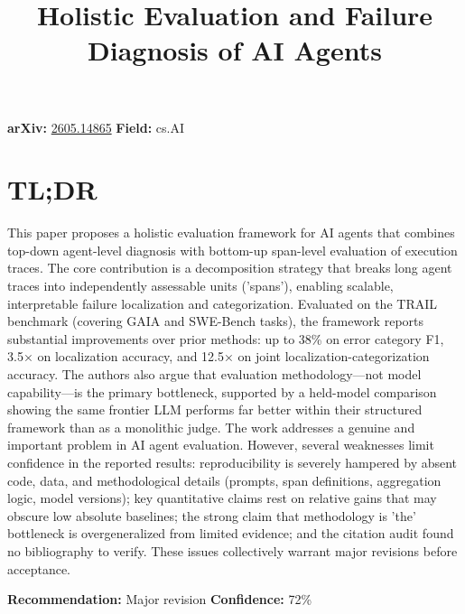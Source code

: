 \documentclass[11pt]{article}
\title{Holistic Evaluation and Failure Diagnosis of AI Agents}
\date{}
\begin{document}
\maketitle

\noindent\textbf{arXiv:} \href{https://arxiv.org/abs/2605.14865}{2605.14865} \quad \textbf{Field:} cs.AI\\

\section*{TL;DR}
This paper proposes a holistic evaluation framework for AI agents that combines top-down agent-level diagnosis with bottom-up span-level evaluation of execution traces. The core contribution is a decomposition strategy that breaks long agent traces into independently assessable units ('spans'), enabling scalable, interpretable failure localization and categorization. Evaluated on the TRAIL benchmark (covering GAIA and SWE-Bench tasks), the framework reports substantial improvements over prior methods: up to 38\% on error category F1, 3.5× on localization accuracy, and 12.5× on joint localization-categorization accuracy. The authors also argue that evaluation methodology—not model capability—is the primary bottleneck, supported by a held-model comparison showing the same frontier LLM performs far better within their structured framework than as a monolithic judge. The work addresses a genuine and important problem in AI agent evaluation. However, several weaknesses limit confidence in the reported results: reproducibility is severely hampered by absent code, data, and methodological details (prompts, span definitions, aggregation logic, model versions); key quantitative claims rest on relative gains that may obscure low absolute baselines; the strong claim that methodology is 'the' bottleneck is overgeneralized from limited evidence; and the citation audit found no bibliography to verify. These issues collectively warrant major revisions before acceptance.

\textbf{Recommendation:} Major revision \quad \textbf{Confidence:} 72\%\\
\end{document}

